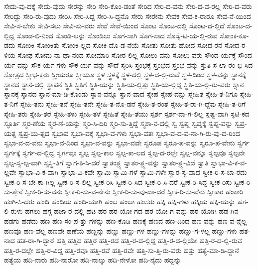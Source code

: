 {ಸೇದು-ವು-ದಕ್ಕೆ
ಸೇದು-ವುದು
ಸೇರನ್ನು
ಸೇರಿ
ಸೇರಿ-ಕೊಂ-ಡಂತೆ
ಸೇರಿದ
ಸೇರಿ-ದ-ವನು
ಸೇರಿ-ದ-ವ-ರಲ್ಲ
ಸೇರಿ-ದ-ವರು
ಸೇರಿದ್ದು
ಸೇರಿ-ರು-ವುದು
ಸೇರಿಸಿ
ಸೇರಿ-ಸಿದ್ದ
ಸೇರಿ-ಸಿ-ದ್ದನೊ
ಸೇರು
ಸೇರೇನು
ಸೇವಕ
ಸೇವ-ಕ-ರಾರೂ
ಸೇವ-ನೆ-ಯಿಂದ
ಸೇವಿ-ಸ-ಬೇಕು
ಸೇವಿ-ಸಲು
ಸೇವಿ-ಸು-ವರು
ಸೇವೆ
ಸೇವೆ-ಯಿಂದ
ಸೊಂಟ
ಸೊಂಟ-ದಲ್ಲಿ
ಸೊಂಟ-ದ-ಲ್ಲಿದೆ
ಸೊಂಟ-ದ-ಲ್ಲಿದ್ದ
ಸೊಂಡ-ಲಿ-ನಿಂದ
ಸೊಂಡಿ-ಲನ್ನು
ಸೊಂಡಿಲು
ಸೊಗ-ಸಾಗಿ
ಸೊಗ-ಸಾದ
ಸೊಸೈ-ಟಿ-ಯ-ಲ್ಲಿ-ರುವ
ಸೋಂಕ-ಕೂ-ಡದು
ಸೋಂಕಿ
ಸೋಂಕಿತು
ಸೋಂಕಿ-ಲ್ಲದ
ಸೋಕಿ-ದೊ-ಡ-ನೆಯೆ
ಸೋತು
ಸೋತು-ಹೋದ
ಸೋದ-ರನ
ಸೋದ-ರ-ಳಿಯ
ಸೋಫ
ಸೋಮ-ನಾ-ಥಾ-ನಂದ
ಸೋಮಾರಿ
ಸೋರ-ಲಿಲ್ಲ
ಸೋಲು-ವನು
ಸೋಲು-ವರು
ಸೌಂದ-ರ್ಯಕ್ಕೆ
ಸೌಂದ-ರ್ಯ-ವನ್ನು
ಸೌಕ-ರ್ಯ-ಗಳು
ಸೌಕ-ರ್ಯ-ವನ್ನು
ಸೌದೆ
ಸ್ಕರಿಸಿ
ಸ್ತಂಭಕ್ಕೆ
ಸ್ತಂಭದ
ಸ್ತಂಭ-ವನ್ನು
ಸ್ತುತಿ-ಸ-ಲಾ-ರಂ-ಭಿ-ಸಿದ
ಸ್ತೋತ್ರದ
ಸ್ತ್ರೀಭ-ಕ್ತರು
ಸ್ತ್ರೀಯರೂ
ಸ್ತ್ರೀಯೂ
ಸ್ಥಳ
ಸ್ಥಳಕ್ಕೆ
ಸ್ಥಳ-ದಲ್ಲಿ
ಸ್ಥಳ-ದ-ಲ್ಲಿ-ರುವೆ
ಸ್ಥಳ-ದಿಂದ
ಸ್ಥಳ-ವನ್ನು
ಸ್ಥಾನಕ್ಕೆ
ಸ್ಥಾನದ
ಸ್ಥಾನ-ದಲ್ಲಿ
ಸ್ಥಾಪನೆ
ಸ್ಥಿತಿ
ಸ್ಥಿತಿಗೆ
ಸ್ಥಿತಿ-ಯನ್ನು
ಸ್ಥಿತಿ-ಯ-ಲ್ಲಿತ್ತು
ಸ್ಥಿತಿ-ಯ-ಲ್ಲಿದ್ದ
ಸ್ಥಿತಿ-ಯ-ಲ್ಲಿ-ರು-ವರು
ಸ್ನಾನ
ಸ್ನಾನಕ್ಕೆ
ಸ್ನಾನದ
ಸ್ನಾನ-ಮಾ-ಡಿ-ಕೊಂಡು
ಸ್ನಾನ-ವನ್ನೂ
ಸ್ನಾನ-ವಾದ
ಸ್ನೇಹ
ಸ್ನೇಹ-ವನ್ನು
ಸ್ನೇಹಿತ
ಸ್ನೇಹಿ-ತ-ನಿಗೂ
ಸ್ನೇಹಿ-ತ-ನಿಗೆ
ಸ್ನೇಹಿ-ತನು
ಸ್ನೇಹಿ-ತನೆ
ಸ್ನೇಹಿ-ತನೇ
ಸ್ನೇಹಿ-ತ-ನೊ-ಡನೆ
ಸ್ನೇಹಿ-ತ-ರಂತೆ
ಸ್ನೇಹಿ-ತ-ರಾ-ಗಿ-ದ್ದೆವು
ಸ್ನೇಹಿ-ತ-ರಿಗೆ
ಸ್ನೇಹಿ-ತರು
ಸ್ನೇಹಿ-ತರೆ
ಸ್ನೇಹಿ-ತಳು
ಸ್ನೇಹಿ-ತಳೆ
ಸ್ನೇಹಿತೆ
ಸ್ನೇಹಿ-ತೆಯು
ಸ್ಪರ್ಶ
ಸ್ಪರ್ಶ-ವಾ-ಗ-ಲಿಲ್ಲ
ಸ್ಪಷ್ಟ-ವಾಗಿ
ಸ್ಫಟಿ-ಕದ
ಸ್ಫೂರ್ತಿ
ಸ್ಮರ-ಣೆಯ
ಸ್ಮರ-ಣೆ-ಯನ್ನು
ಸ್ಮರಿ-ಸಿ-ದಿರಿ
ಸ್ಮರಿ-ಸು-ತ್ತಿದ್ದೆ
ಸ್ಮಶಾ-ನ-ದಲ್ಲಿ
ಸ್ವ
ಸ್ವಪ್ನ
ಸ್ವಪ್ನಕ್ಕೆ
ಸ್ವಪ್ನ-ವನ್ನು
ಸ್ವಪ್ರ-ಯತ್ನ
ಸ್ವಪ್ರ-ಯ-ತ್ನದ
ಸ್ವಭಾವ
ಸ್ವಭಾ-ವಕ್ಕೆ
ಸ್ವಭಾ-ವ-ಗಳು
ಸ್ವಭಾ-ವತಃ
ಸ್ವಭಾ-ವ-ದ-ವ-ನಾ-ಗಿ-ರು-ವು-ದ-ರಿಂದ
ಸ್ವಭಾ-ವ-ದ-ವನು
ಸ್ವಭಾ-ವ-ದಿಂದ
ಸ್ವಭಾ-ವ-ವನ್ನು
ಸ್ವಭಾ-ವವೇ
ಸ್ವರೂಪ
ಸ್ವರೂ-ಪ-ವನ್ನು
ಸ್ವರೂ-ಪ-ವೇನು
ಸ್ವರ್ಗ
ಸ್ವರ್ಗಕ್ಕೆ
ಸ್ವರ್ಗ-ದ-ಲ್ಲಿದ್ದ
ಸ್ವರ್ಗವೂ
ಸ್ವಲ್ಪ
ಸ್ವಲ್ಪ-ಕಾಲ
ಸ್ವಲ್ಪ-ಕಾ-ಲದ
ಸ್ವಲ್ಪ-ದ-ರಲ್ಲೇ
ಸ್ವಲ್ಪ-ವನ್ನೂ
ಸ್ವಲ್ಪವೂ
ಸ್ವಲ್ಪವೇ
ಸ್ವಲ್ಪ-ಸ್ವ-ಲ್ಪ-ವಾಗಿ
ಸ್ವಸ್ಥಿ-ತಿಗೆ
ಸ್ವಾಗ-ತಿ-ಸಿ-ದರೆ
ಸ್ವಾತಂತ್ರ್ಯ
ಸ್ವಾತಂ-ತ್ರ್ಯ-ವನ್ನು
ಸ್ವಾತಂ-ತ್ರ್ಯ-ವಿದೆ
ಸ್ವಾತಿ
ಸ್ವಾಭಾ-ವಿ-ಕ-ವ-ಲ್ಲವೇ
ಸ್ವಾಭಾ-ವಿ-ಕ-ವಾಗಿ
ಸ್ವಾಭಾ-ವಿ-ಕವೇ
ಸ್ವಾಮಿ
ಸ್ವಾಮಿ-ಗಳೆ
ಸ್ವಾಮಿ-ಗಳೇ
ಸ್ವಾರ-ಸ್ಯ-ವಾದ
ಸ್ವೀಕ-ರಿ-ಸ-ಬಾ-ರದು
ಸ್ವೀಕ-ರಿ-ಸ-ಬೇ-ಕಾ-ಗಿಲ್ಲ
ಸ್ವೀಕ-ರಿ-ಸ-ಲಿಲ್ಲ
ಸ್ವೀಕ-ರಿಸಿ
ಸ್ವೀಕ-ರಿ-ಸಿದ
ಸ್ವೀಕ-ರಿ-ಸಿ-ದರೆ
ಸ್ವೀಕ-ರಿ-ಸಿದ್ದ
ಸ್ವೀಕ-ರಿಸು
ಸ್ವೀಕ-ರಿ-ಸು-ತ್ತೇನೆ
ಸ್ವೀಕ-ರಿ-ಸು-ವನು
ಸ್ವೀಕ-ರಿ-ಸು-ವ-ನೇನು
ಸ್ವೀಕ-ರಿ-ಸು-ವು-ದಾ-ದರೆ
ಸ್ವೀಕ-ರಿ-ಸು-ವೆನು
ಸ್ವೀಕಾರ
ಹಂಕಾರಿ
ಹಂಗಿ-ಸಿ-ದರು
ಹಂದಿ
ಹಂದಿಯ
ಹಂದಿ-ಯಾಗಿ
ಹಂಬ
ಹಂಬಾ
ಹಂಸರು
ಹಕ್ಕಿ
ಹಕ್ಕಿ-ಗಳು
ಹಕ್ಕಿಯ
ಹಕ್ಕಿ-ಯನ್ನು
ಹಗ-ಲಿ-ರುಳು
ಹಗಲು
ಹಗ್ಗ
ಹಜಾ-ರ-ದಲ್ಲಿ
ಹಟ
ಹಠ
ಹಠ-ಯೋ-ಗದ
ಹಠ-ಯೋ-ಗ-ವನ್ನು
ಹಠ-ಯೋಗಿ
ಹಡ-ಗಿನ
ಹಡಗು
ಹಡೆದು
ಹಣ
ಹಣ-ಸಂ-ಪ-ತ್ತು-ಗಳನ್ನು
ಹಣ-ಕೊಡಿ
ಹಣಕ್ಕೆ
ಹಣದ
ಹಣ-ದಿಂದ
ಹಣ-ವನ್ನು
ಹಣ-ವ-ನ್ನೆಲ್ಲ
ಹಣವೂ
ಹಣ-ವೆಲ್ಲ
ಹಣವೇ
ಹಣೆಯ
ಹಣ್ಣನ್ನು
ಹಣ್ಣು
ಹಣ್ಣು-ಗಳ
ಹಣ್ಣು-ಗಳನ್ನು
ಹಣ್ಣು-ಗ-ಳಲ್ಲ
ಹಣ್ಣು-ಗಳು
ಹತ-ನಾದ
ಹತ-ರಾ-ಗಿ-ದ್ದಾರೆ
ಹತ್ತಿ
ಹತ್ತಿದ
ಹತ್ತಿರ
ಹತ್ತಿ-ರದ
ಹತ್ತಿ-ರ-ದ-ಲ್ಲಿದ್ದ
ಹತ್ತಿ-ರ-ದ-ಲ್ಲಿಯೇ
ಹತ್ತಿ-ರ-ದ-ಲ್ಲಿ-ರುವ
ಹತ್ತಿ-ರ-ದಲ್ಲೇ
ಹತ್ತಿ-ರ-ವಿದ್ದ
ಹತ್ತಿ-ರವೂ
ಹತ್ತಿ-ರವೆ
ಹತ್ತಿ-ರವೇ
ಹತ್ತಿ-ಸು-ತ್ತಿ-ರು-ವರು
ಹತ್ತು
ಹತ್ಯೆ-ಮಾ-ಡಿ-ದ್ದಾನೆ
ಹತ್ಯೆಯ
ಹದಿ-ನಾರು
ಹದಿ-ನಾರೋ
ಹದಿ-ನಾಲ್ಕು
ಹದಿ-ನೇಳೋ
ಹದಿ-ನೈದು
ಹದ್ದನ್ನು
}
